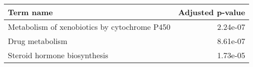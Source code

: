 \begin{tabular}{lr}
\toprule
                                   Term name &  Adjusted p-value \\
\midrule
Metabolism of xenobiotics by cytochrome P450 &          2.24e-07 \\
                             Drug metabolism &          8.61e-07 \\
                Steroid hormone biosynthesis &          1.73e-05 \\
\bottomrule
\end{tabular}
